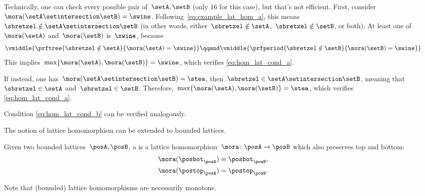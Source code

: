 \begin{example}
    Technically, one can check every possible pair of~$\setA,\setB$ (only 16 for this case), but that's not efficient.
    First, consider~$\mora(\setA\setintersection \setB)=\swine$.
    Following~\cref{eq:example_lat_hom_a}, this means~$\sbretzel \notin \setA\setintersection \setB$ (in other words, either~$\sbretzel \notin \setA$,~$\sbretzel \notin \setB$, or both).
    At least one of~$\mora(\setA)$ and~$\mora(\setB)$ is~$\swine$, because
    \begin{equation*}
        \vmiddle{
            \prftree{
                \sbretzel \notin \setA
            }{
                \mora(\setA) = \swine
            }
        }
        \qqand
        \vmiddle{
            \prfperiod{
                \sbretzel \notin \setB
            }{
                \mora(\setB) = \swine
            }
        }
    \end{equation*}
    This implies~$\max\{\mora(\setA),\mora(\setB)\}=\swine$, which verifies \cref{eq:hom_lat_cond_a}.

    If instead, one has~$\mora(\setA\setintersection \setB)=\stea$, then~$\sbretzel \in \setA\setintersection \setB$, meaning that~$\sbretzel \in \setA$ and~$\sbretzel \in \setB$.
    Therefore,~$\max\{ \mora(\setA),\mora(\setB)\}=\stea$, which verifies \cref{eq:hom_lat_cond_a}.

    Condition \cref{eq:hom_lat_cond_b} can be verified analogously.
\end{example}

The notion of lattice homomorphism can be extended to bounded lattices.

\begin{ctdefinition}
    \label{def:bounded_lat_homomorphism}
    Given two bounded lattices~$\posA,\posB$, a \emph{} is a lattice homomorphism~$\mora\colon \posA\to \posB$ which also preserves top and bottom:
    \begin{equation}
        \begin{aligned}
            \mora(\posbot_\posA) & =\posbot_\posB, \\
            \mora(\postop_\posA) & =\postop_\posB.
        \end{aligned}
    \end{equation}
\end{ctdefinition}

Note that (bounded) lattice homomorphisms are necessarily monotone.

